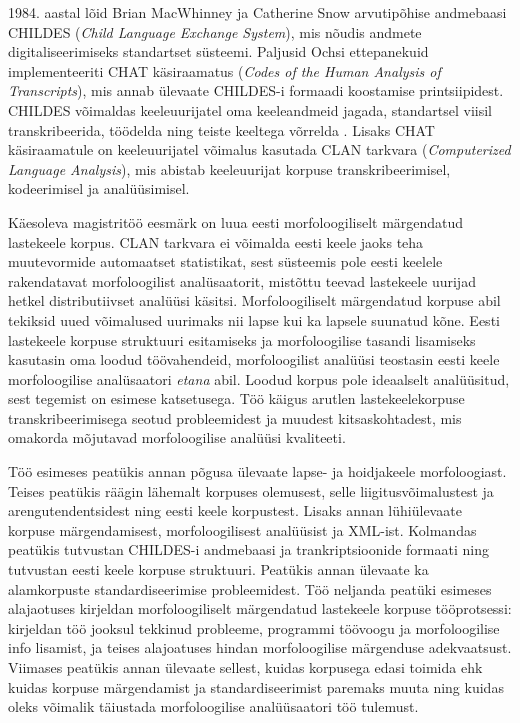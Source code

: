 \documentclass[12pt]{article}
\begin{document}
1984. aastal lõid Brian MacWhinney ja Catherine Snow arvutipõhise andmebaasi CHILDES (\emph{Child Language Exchange System}), mis nõudis andmete digitaliseerimiseks standartset süsteemi. Paljusid Ochsi ettepanekuid implementeeriti CHAT käsiraamatus (\emph{Codes of the Human Analysis of Transcripts}), mis annab ülevaate CHILDES-i formaadi koostamise printsiipidest. CHILDES võimaldas keeleuurijatel oma keeleandmeid jagada, standartsel viisil transkribeerida, töödelda ning teiste keeltega võrrelda \citep{SnowMacWhinney}. Lisaks CHAT käsiraamatule on keeleuurijatel võimalus kasutada CLAN tarkvara (\emph{Computerized Language Analysis}), mis abistab keeleuurijat korpuse transkribeerimisel, kodeerimisel ja analüüsimisel.

Käesoleva magistritöö eesmärk on luua eesti morfoloogiliselt märgendatud lastekeele korpus. CLAN tarkvara ei võimalda eesti keele jaoks teha muutevormide automaatset statistikat, sest süsteemis pole eesti keelele rakendatavat morfoloogilist analüsaatorit, mistõttu teevad lastekeele uurijad hetkel distributiivset analüüsi käsitsi. Morfoloogiliselt märgendatud korpuse abil tekiksid uued võimalused uurimaks nii lapse kui ka lapsele suunatud kõne. Eesti lastekeele korpuse struktuuri esitamiseks ja morfoloogilise tasandi lisamiseks kasutasin oma loodud töövahendeid, morfoloogilist analüüsi teostasin eesti keele morfoloogilise analüsaatori \emph{etana} abil. Loodud korpus pole ideaalselt analüüsitud, sest tegemist on esimese katsetusega. Töö käigus arutlen lastekeelekorpuse transkribeerimisega seotud probleemidest ja muudest kitsaskohtadest, mis omakorda mõjutavad morfoloogilise analüüsi kvaliteeti.

Töö esimeses peatükis annan põgusa ülevaate lapse- ja hoidjakeele morfoloogiast. Teises peatükis räägin lähemalt korpuses olemusest, selle liigitusvõimalustest ja arengutendentsidest ning eesti keele korpustest. Lisaks annan lühiülevaate korpuse märgendamisest, morfoloogilisest analüüsist ja XML-ist. Kolmandas peatükis tutvustan CHILDES-i andmebaasi ja trankriptsioonide formaati ning tutvustan eesti keele korpuse struktuuri. Peatükis annan ülevaate ka alamkorpuste standardiseerimise probleemidest. Töö neljanda peatüki esimeses alajaotuses kirjeldan morfoloogiliselt märgendatud lastekeele korpuse tööprotsessi: kirjeldan töö jooksul tekkinud probleeme, programmi töövoogu ja morfoloogilise info lisamist, ja teises alajoatuses hindan morfoloogilise märgenduse adekvaatsust. Viimases peatükis annan ülevaate sellest, kuidas korpusega edasi toimida ehk kuidas korpuse märgendamist ja standardiseerimist paremaks muuta ning kuidas oleks võimalik täiustada morfoloogilise analüüsaatori töö tulemust.
\end{document}
